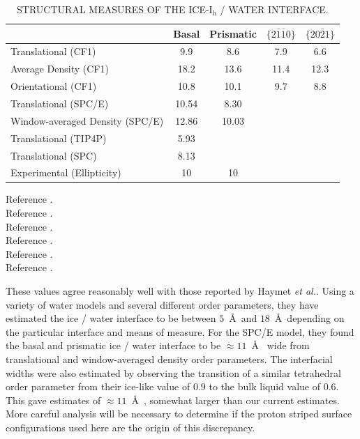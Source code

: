 \begin{table}[h]
\centering
\caption{STRUCTURAL MEASURES OF THE ICE-I$_\mathrm{h}$ / WATER
  INTERFACE. \label{tab:structCompare}} 
\begin{tabular}{|l|cccc|}  
\hline
& Basal & Prismatic & $\{2\bar{1}\bar{1}0\}$ & $\{20\bar{2}1\}$ \\
\hline
Translational (CF1)\footnotemark[1] & 9.9 & 8.6  & 7.9 & 6.6 \\
Average Density (CF1)\footnotemark[1] & 18.2 & 13.6 & 11.4 & 12.3 \\
Orientational (CF1)\footnotemark[2] & 10.8 & 10.1 & 9.7 & 8.8 \\
Translational (SPC/E)\footnotemark[5] & 10.54 & 8.30 & & \\
Window-averaged Density (SPC/E) \footnotemark[5] & 12.86 & 10.03 & & \\
Translational (TIP4P)\footnotemark[3] & 5.93 & & & \\
Translational (SPC)\footnotemark[4] & 8.13 & & & \\
Experimental (Ellipticity)\footnotemark[6] & 10 & 10 & & \\
\hline
\end{tabular}
\flushleft
  \footnotemark[1]\footnotesize{Reference \cite{Hayward2001}.} \\
  \footnotemark[2]\footnotesize{Reference \cite{Hayward2002}.} \\
  \footnotemark[3]\footnotesize{Reference \cite{Karim1988}.} \\
  \footnotemark[4]\footnotesize{Reference \cite{Karim1990}.} \\
  \footnotemark[5]\footnotesize{Reference \cite{Bryk2002}.} \\
  \footnotemark[6]\footnotesize{Reference \cite{Beaglehole1993}.} \\
\end{table}








These values agree reasonably well with those reported by Haymet
\textit{et
  al.}.\cite{Karim1988,Karim1990,Hayward2001,Bryk2002,Hayward2002,Bryk2004}
Using a variety of water models and several different order
parameters, they have estimated the ice / water interface to be
between $5$~\AA~and $18$~\AA~depending on the particular interface and
means of measure.  For the SPC/E model, they found the basal and
prismatic ice / water interface to be $\approx 11$~\AA~ wide from
translational and window-averaged density order parameters. The
interfacial widths were also estimated by observing the transition of
a similar tetrahedral order parameter from their ice-like value of
$0.9$ to the bulk liquid value of $0.6$. This gave estimates of
$\approx 11$~\AA~, somewhat larger than our current estimates. More
careful analysis will be necessary to determine if the proton striped
surface configurations used here are the origin of this discrepancy.


